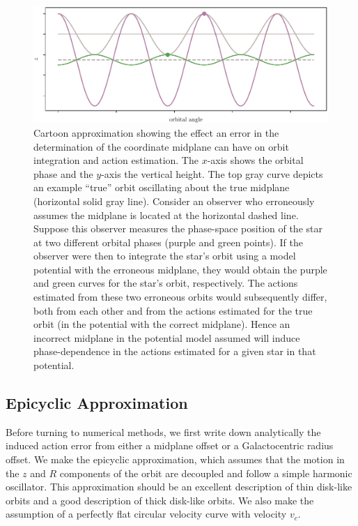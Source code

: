 \documentclass[twocolumn]{aastex62}
\begin{document}
\begin{figure}
\begin{center}
\includegraphics[width=\textwidth]{fig/cartoon.pdf}
\end{center}
\caption{Cartoon approximation showing the effect an error in the determination of the
coordinate midplane can have on orbit integration and action estimation. The
$x$-axis shows the orbital phase and the $y$-axis the vertical height. The top
gray curve depicts an example ``true'' orbit oscillating about the true
midplane (horizontal solid gray line). Consider an observer who erroneously
assumes the midplane is located at the horizontal dashed line. Suppose this
observer measures the phase-space position of the star at two different
orbital phases (purple and green points). If the observer were then to
integrate the star's orbit using a model potential with the erroneous
midplane, they would obtain the purple and green curves for the star's orbit,
respectively. The actions estimated from these two  erroneous orbits would
subsequently differ, both from each other and from the actions estimated for
the true orbit (in the potential with the correct midplane). Hence an
incorrect midplane in the potential model assumed will induce phase-dependence
in the actions estimated for a given star in that potential.}
\label{fig:cartoon}
\end{figure}

\subsection{Epicyclic Approximation} \label{ssec:epi_action}
Before turning to numerical methods, we first write down analytically the
induced action error from either a midplane offset or a Galactocentric radius
offset. We make the epicyclic approximation, which assumes that the motion in
the $z$ and $R$ components of the orbit are decoupled and follow a simple
harmonic oscillator. This approximation should be an excellent description of
thin disk-like orbits and a good description of thick disk-like orbits. We
also make the assumption of a perfectly flat circular velocity curve with
velocity $v_c$.
\end{document}
